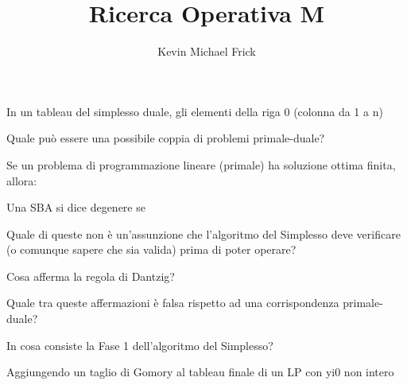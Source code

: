 \documentclass[answers, a4paper, 11pt]{exam}
\title{Ricerca Operativa M}
\author{Kevin Michael Frick}
\begin{document}
\maketitle
\begin{questions}
\question In un tableau del simplesso duale, gli elementi della riga 0 (colonna da 1 a n)
\begin{solution}

\end{solution}

\question Quale può essere una possibile coppia di problemi primale-duale?
\begin{solution}

\end{solution}

\question Se un problema di programmazione lineare (primale) ha soluzione ottima finita, allora:
\begin{solution}

\end{solution}

\question Una SBA si dice degenere se
\begin{solution}

\end{solution}

\question Quale di queste non è un'assunzione che l'algoritmo del Simplesso deve verificare (o comunque sapere che sia valida) prima di poter operare?
\begin{solution}

\end{solution}

\question Cosa afferma la regola di Dantzig?
\begin{solution}

\end{solution}

\question Quale tra queste affermazioni è falsa rispetto ad una corrispondenza primale-duale?
\begin{solution}

\end{solution}

\question In cosa consiste la Fase 1 dell'algoritmo del Simplesso?
\begin{solution}

\end{solution}

\question Aggiungendo un taglio di Gomory al tableau finale di un LP con yi0 non intero
\begin{solution}


\end{solution}
\end{questions}
\end{document}
